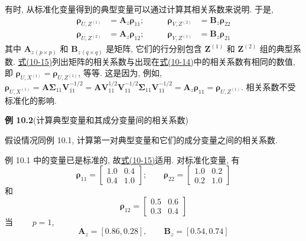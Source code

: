 有时, 从标准化变量得到的典型变量可以通过计算其相关系数来说明. 于是,
\label{eq:10-15}
\begin{equation}
\begin{aligned}
\boldsymbol{\rho}_{U,Z^{(1)}}&=\mathbf{A}_z\boldsymbol{\rho}_{11}; &\qquad \boldsymbol{\rho}_{V,Z^{(2)}}&=\mathbf{B}_z\boldsymbol{\rho}_{22}\\
\boldsymbol{\rho}_{U,Z^{(2)}}&=\mathbf{A}_z\boldsymbol{\rho}_{12}; &\qquad \boldsymbol{\rho}_{V,Z^{(1)}}&=\mathbf{B}_z\boldsymbol{\rho}_{21}
\end{aligned}
\tag{10-15}
\end{equation}
其中 $\mathbf{A}_z{}_{(p\times p)}$ 和 $\mathbf{B}_z{}_{(q\times q)}$ 是矩阵, 它们的行分别包含 $\mathbf{Z}^{(1)}$ 和 $\mathbf{Z}^{(2)}$ 组的典型系数. \hyperref[eq:10-15]{式(10-15)}列出矩阵的相关系数与出现在\hyperref[eq:10-14]{式(10-14)}中的相关系数有相同的数值, 即 $\boldsymbol{\rho}_{U,X^{(1)}}=\boldsymbol{\rho}_{U,Z^{(1)}}$, 等等. 这是因为, 例如, $\boldsymbol{\rho}_{U,X^{(1)}}=\mathbf{A}\boldsymbol{\Sigma}_{11}\mathbf{V}_{11}^{-1/2}=\mathbf{A}\mathbf{V}_{11}^{1/2}\mathbf{V}_{11}^{-1/2}\boldsymbol{\Sigma}_{11}\mathbf{V}_{11}^{-1/2}=\mathbf{A}_z\boldsymbol{\rho}_{11}=\boldsymbol{\rho}_{U,Z^{(1)}}$. 相关系数不受标准化的影响.

\noindent\textbf{例 10.2}\quad (计算典型变量和其成分变量间的相关系数)

假设情况同例 10.1, 计算第一对典型变量和它们的成分变量之间的相关系数.

例 10.1 中的变量已是标准的, 故\hyperref[eq:10-15]{式(10-15)}适用. 对标准化变量, 有
\[
\boldsymbol{\rho}_{11}=\begin{bmatrix}1.0 & 0.4\\ 0.4 & 1.0\end{bmatrix};\qquad \boldsymbol{\rho}_{22}=\begin{bmatrix}1.0 & 0.2\\ 0.2 & 1.0\end{bmatrix}
\]
和
\[
\boldsymbol{\rho}_{12}=\begin{bmatrix}0.5 & 0.6\\ 0.3 & 0.4\end{bmatrix}
\]
当 $\qquad p=1$,
\[
\mathbf{A}_z=[0.86,0.28],\qquad \mathbf{B}_z=[0.54,0.74]
\]
